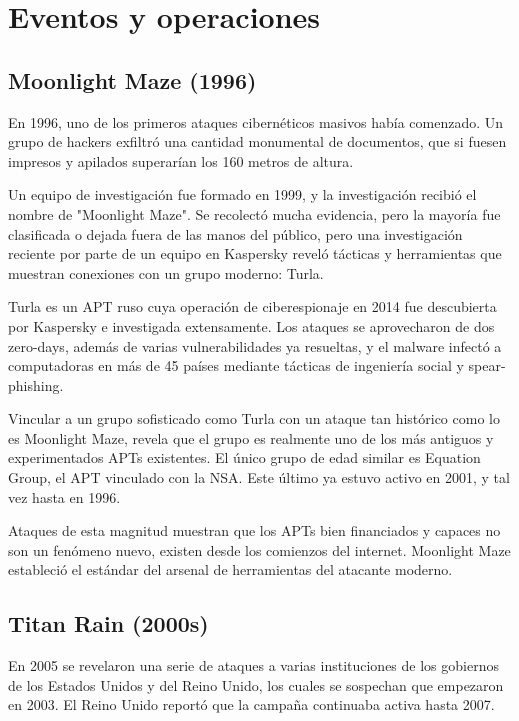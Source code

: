 \documentclass{article}
\begin{document}
\section{Eventos y operaciones}

\subsection{Moonlight Maze (1996)}
En 1996, uno de los primeros ataques cibernéticos masivos había comenzado. Un grupo de hackers exfiltró una cantidad monumental de documentos, que si fuesen impresos y apilados superarían los 160 metros de altura. \autocite{securelist-moonlight-maze}

Un equipo de investigación fue formado en 1999, y la investigación recibió el nombre de "Moonlight Maze". Se recolectó mucha evidencia, pero la mayoría fue clasificada o dejada fuera de las manos del público, pero una investigación reciente por parte de un equipo en Kaspersky reveló tácticas y herramientas que muestran conexiones con un grupo moderno: Turla.

Turla es un APT ruso cuya operación de ciberespionaje en 2014 fue descubierta por Kaspersky e investigada extensamente. Los ataques se aprovecharon de dos zero-days, además de varias vulnerabilidades ya resueltas, y el malware infectó a computadoras en más de 45 países mediante tácticas de ingeniería social y spear-phishing. \autocite{securelist-turla}

Vincular a un grupo sofisticado como Turla con un ataque tan histórico como lo es Moonlight Maze, revela que el grupo es realmente uno de los más antiguos y experimentados APTs existentes. El único grupo de edad similar es Equation Group, el APT vinculado con la NSA. Este último ya estuvo activo en 2001, y tal vez hasta en 1996. \autocite{securelist-equation}

Ataques de esta magnitud muestran que los APTs bien financiados y capaces no son un fenómeno nuevo, existen desde los comienzos del internet. Moonlight Maze estableció el estándar del arsenal de herramientas del atacante moderno. 

\subsection{Titan Rain (2000s)}
En 2005 se revelaron una serie de ataques a varias instituciones de los gobiernos de los Estados Unidos y del Reino Unido, los cuales se sospechan que empezaron en 2003. El Reino Unido reportó que la campaña continuaba activa hasta 2007. \autocite{cfr-titan-rain}
\end{document}
